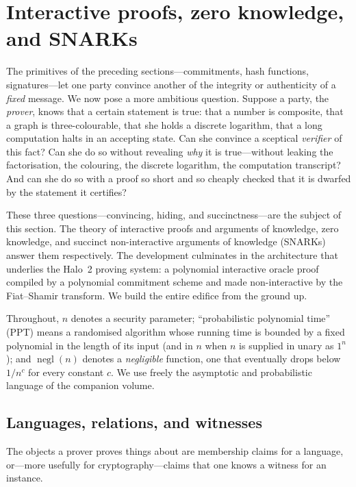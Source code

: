 \documentclass[11pt,a4paper]{article}
\theoremstyle{definition}
\theoremstyle{remark}
\DeclareMathOperator{\negl}{negl}
\begin{document}
\clearpage

\section{Interactive proofs, zero knowledge, and SNARKs}\label{sec:zk}

The primitives of the preceding sections---commitments, hash functions, signatures---let one party convince another of the integrity or authenticity of a \emph{fixed} message. We now pose a more ambitious question. Suppose a party, the \emph{prover}, knows that a certain statement is true: that a number is composite, that a graph is three-colourable, that she holds a discrete logarithm, that a long computation halts in an accepting state. Can she convince a sceptical \emph{verifier} of this fact? Can she do so without revealing \emph{why} it is true---without leaking the factorisation, the colouring, the discrete logarithm, the computation transcript? And can she do so with a proof so short and so cheaply checked that it is dwarfed by the statement it certifies?

These three questions---convincing, hiding, and succinctness---are the subject of this section. The theory of interactive proofs and arguments of knowledge, zero knowledge, and succinct non-interactive arguments of knowledge (SNARKs) answer them respectively. The development culminates in the architecture that underlies the Halo~2 proving system: a polynomial interactive oracle proof compiled by a polynomial commitment scheme and made non-interactive by the Fiat--Shamir transform. We build the entire edifice from the ground up.

Throughout, \(n\) denotes a security parameter; ``probabilistic polynomial time'' (PPT) means a randomised algorithm whose running time is bounded by a fixed polynomial in the length of its input (and in \(n\) when \(n\) is supplied in unary as \(1^n\)); and \(\negl(n)\) denotes a \emph{negligible} function, one that eventually drops below \(1/n^c\) for every constant \(c\). We use freely the asymptotic and probabilistic language of the companion volume.

\subsection{Languages, relations, and witnesses}\label{zk:subsec:languages}

The objects a prover proves things about are membership claims for a language, or---more usefully for cryptography---claims that one knows a witness for an instance.
\end{document}
